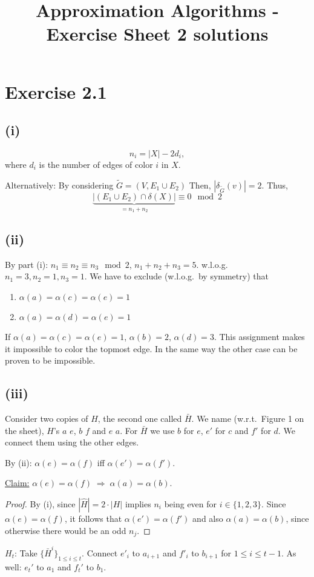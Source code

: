 \documentclass[oneside,a4paper]{amsart}
\begin{document}
\title{Approximation Algorithms - Exercise Sheet 2 solutions}
\maketitle{}
\section*{Exercise 2.1}
\subsection*{(i)}
\[
	n_i = |X| - 2 d_i,
\]
where $d_i$ is the number of edges of color $i$ in $X$.

Alternatively: By considering $\tilde{G} = (V, E_1 \cup E_2)$ Then, $|\delta_{\tilde{G}}(v)| = 2$. Thus,
\[
	\underbrace{ |(E_1 \cup E_2) \cap \delta(X)| }_{= n_1 + n_2} \equiv 0 \mod 2
\]
\subsection*{(ii)}
By part (i): $n_1 \equiv n_2 \equiv n_3 \mod 2$, $n_1 + n_2 + n_3 = 5$.
w.l.o.g.\ $n_1 = 3, n_2 = 1, n_3 = 1$.
We have to exclude (w.l.o.g.\ by symmetry) that
\begin{enumerate}
\item $\alpha(a) = \alpha(c) = \alpha(e) = 1$
\item $\alpha(a) = \alpha(d) = \alpha(e) = 1$
\end{enumerate}
If $\alpha(a) = \alpha(c) = \alpha(e) = 1$, $\alpha(b) = 2$, $\alpha(d) = 3$. This assignment makes it impossible to color the topmost edge. In the same way the other case can be proven to be impossible.
\subsection*{(iii)}
Consider two copies of $H$, the second one called $\bar{H}$. We name (w.r.t.\ Figure 1 on the sheet), $H$'s $a$ $e$, $b$ $f$ and $e$ $a$. For $\bar{H}$ we use $b$ for $e$, $e'$ for $c$ and $f'$ for $d$. We connect them using the other edges.

By (ii): $\alpha(e) = \alpha(f)$ iff $\alpha(e') = \alpha(f')$.

\underline{Claim:} $\alpha(e) = \alpha(f) \; \Rightarrow \; \alpha(a) = \alpha(b)$.
\begin{proof}
By (i), since $|\hat{H}| = 2 \cdot |H|$ implies $n_i$ being even for $i \in \{ 1, 2, 3\}$.
Since $\alpha(e) = \alpha(f)$, it follows that $\alpha(e') = \alpha(f')$ and also $\alpha(a) = \alpha(b)$, since otherwise there would be an odd $n_j$.
\end{proof}
$H_t$: Take $\{ \bar{H}^i \}_{1 \leq i \leq t}$.
Connect $e'_i$ to $a_{i+1}$ and $f'_i$ to $b_{i+1}$ for $1 \leq i \leq t - 1$.
As well: $e_t'$ to $a_1$ and $f_t'$ to $b_1$.
\end{document}
